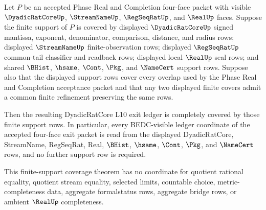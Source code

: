 \begin{theorem}
\label{thm:dyadicratcore-l10-exit-ledger-finite-support-coverage}
Let $P$ be an accepted Phase Real and Completion four-face packet with visible $\DyadicRatCoreUp$, $\StreamNameUp$, $\RegSeqRatUp$, and $\RealUp$ faces. Suppose the finite support of $P$ is covered by displayed $\DyadicRatCoreUp$ signed mantissa, exponent, denominator, comparison, distance, and radius rows; displayed $\StreamNameUp$ finite-observation rows; displayed $\RegSeqRatUp$ common-tail classifier and readback rows; displayed local $\RealUp$ seal rows; and shared $\BHist$, $\hsame$, $\Cont$, $\Pkg$, and $\NameCert$ support rows. Suppose also that the displayed support rows cover every overlap used by the Phase Real and Completion acceptance packet and that any two displayed finite covers admit a common finite refinement preserving the same rows.

Then the resulting DyadicRatCore L10 exit ledger is completely covered by those finite support rows. In particular, every BEDC-visible ledger coordinate of the accepted four-face exit packet is read from the displayed DyadicRatCore, StreamName, RegSeqRat, Real, $\BHist$, $\hsame$, $\Cont$, $\Pkg$, and $\NameCert$ rows, and no further support row is required.

This finite-support coverage theorem has no coordinate for quotient rational equality, quotient stream equality, selected limits, countable choice, metric-completeness data, aggregate formalstatus rows, aggregate bridge rows, or ambient $\RealUp$ completeness.
\end{theorem}
